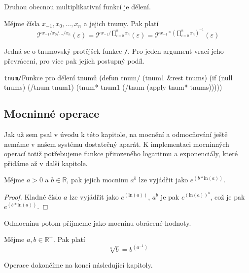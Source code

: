 Druhou obecnou multiplikativní funkcí je dělení.

\begin{fact}
Mějme čísla $x_{-1}, x_0, \ldots, x_n$ a jejich tnumy. Pak platí
\begin{equation}
\mathcal{T}^{x_{-1}/x_0/\ldots /x_n}(\varepsilon)=\mathcal{T}^{x_{-1}/\prod_{i=0}^nx_n}(\varepsilon)=\mathcal{T}^{x_{-1}*(\prod_{i=0}^nx_n)^{-1}}(\varepsilon)
\end{equation}
\end{fact}

Jedná se o tnumovský protějšek funkce \texttt{/}. Pro jeden argument vrací jeho převrácení, pro více pak jejich postupný podíl.

\begin{lispcode}{\texttt{tnum/}}{Funkce pro dělení tnumů}
(\textcolor{funkcionalni}{defun} \textcolor{pojmenovan}{tnum/} (tnum1 &rest tnums)
  (\textcolor{funkcionalni}{if} (\textcolor{funkcionalni}{null} tnums)
    (\textcolor{moje}{/tnum} tnum1)
    (\textcolor{moje}{tnum*} tnum1 (\textcolor{moje}{/tnum} (\textcolor{funkcionalni}{apply} \textquotesingle\textcolor{moje}{tnum*} tnums)))))
\end{lispcode}

\subsection{Mocninné operace}
Jak už sem psal v úvodu k této kapitole, na mocnění a odmocňování ještě nemáme v našem systému dostatečný aparát. K implementaci mocninných operací totiž potřebujeme funkce přirozeného logaritmu a exponenciály, které přidáme až v další kapitole.

\begin{lemma}\label{vet:mocnina_tnumu}
Mějme $a>0$ a $b\in\mathbb{R}$, pak jejich mocninu $a^b$ lze vyjádřit jako $e^{(b*\mathrm{ln}(a))}$.
\begin{proof}
Kladné číslo $a$ lze vyjádřit jako $e^{(\mathrm{ln}(a))}$, $a^b$ je pak $e^{({\mathrm{ln}(a)})^b}$, což je pak $e^{(b*\mathrm{ln}(a))}$.
\end{proof}
\end{lemma}

Odmocninu potom přijmeme jako mocninu obrácené hodnoty.

\begin{fact}\label{fac:odmocnina_tnumu}
Mějme $a, b\in\mathbb{R^+}$. Pak platí
\begin{equation}
\sqrt[a]{b}=b^{(a^{-1})}
\end{equation}
\end{fact}

Operace dokončíme na konci následující kapitoly.

